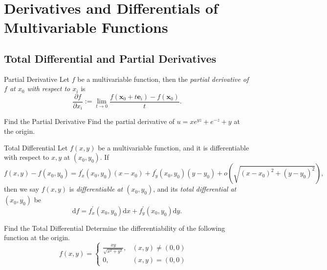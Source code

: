 
\section{Derivatives and Differentials of Multivariable Functions}

\subsection{Total Differential and Partial Derivatives}

\begin{definition}{Partial Derivative}{}
  Let $f$ be a multivariable function, then the \emph{partial derivative of $f$
  at $x_0$ with respect to $x_i$} is
  \begin{equation}
    \frac{\partial f}{\partial x_i} := \lim \limits _{t \rightarrow 0} \frac{f(\mathbf{x}_0 + t\mathbf{e}_i) - f(\mathbf{x}_0)}{t}.
  \end{equation}
\end{definition}

\begin{example}{Find the Partial Derivative}{}
  Find the partial derivative of $u = xe^{yz} + e^{-z} + y$ at the origin.
\end{example}

\begin{definition}{Total Differential}{}
  Let $f(x, y)$ be a multivariable function,
  and it is differentiable with respect to $x, y$ at $(x_0, y_0)$.
  If
  \begin{equation}
    f(x, y) - f(x_0, y_0) = f^{\prime}_x(x_0, y_0)(x - x_0)
    + f^{\prime}_y (x_0, y_0)(y - y_0) + o(\sqrt{(x - x_0)^2 + (y - y_0)^2}),
  \end{equation}
  then we say $f(x,y)$ is \emph{differentiable at $(x_0, y_0)$},
  and its \emph{total differential at $(x_0, y_0)$} be
  \begin{equation}
    \mathrm{d} f = f_x^{\prime}(x_0, y_0) \mathrm{d} x + f_y^{\prime}(x_0, y_0) \mathrm{d} y.
  \end{equation}
\end{definition}

\begin{example}{Find the Total Differential}{}
  Determine the differentiability of the following function at the origin.
  \begin{equation}
    f(x,y)=\begin{cases}\frac{xy}{\sqrt{x^2+y^2}},&(x,y)\neq(0,0)\\0,&(x,y)=(0,0)\end{cases} \quad
  \end{equation}
\end{example}

